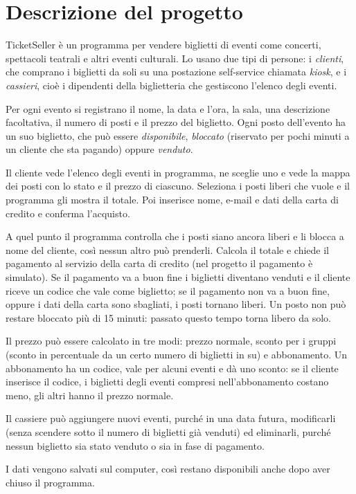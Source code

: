 \section{Descrizione del progetto}
\label{sec:descrizione}

TicketSeller è un programma per vendere biglietti di eventi come concerti, spettacoli teatrali e altri eventi culturali. Lo usano due tipi di persone: i \emph{clienti}, che comprano i biglietti da soli su una postazione self-service chiamata \emph{kiosk}, e i \emph{cassieri}, cioè i dipendenti della biglietteria che gestiscono l'elenco degli eventi.

Per ogni evento si registrano il nome, la data e l'ora, la sala, una descrizione facoltativa, il numero di posti e il prezzo del biglietto. Ogni posto dell'evento ha un suo biglietto, che può essere \emph{disponibile}, \emph{bloccato} (riservato per pochi minuti a un cliente che sta pagando) oppure \emph{venduto}.

Il cliente vede l'elenco degli eventi in programma, ne sceglie uno e vede la mappa dei posti con lo stato e il prezzo di ciascuno. Seleziona i posti liberi che vuole e il programma gli mostra il totale. Poi inserisce nome, e-mail e dati della carta di credito e conferma l'acquisto.

A quel punto il programma controlla che i posti siano ancora liberi e li blocca a nome del cliente, così nessun altro può prenderli. Calcola il totale e chiede il pagamento al servizio della carta di credito (nel progetto il pagamento è simulato). Se il pagamento va a buon fine i biglietti diventano venduti e il cliente riceve un codice che vale come biglietto; se il pagamento non va a buon fine, oppure i dati della carta sono sbagliati, i posti tornano liberi. Un posto non può restare bloccato più di 15 minuti: passato questo tempo torna libero da solo.

Il prezzo può essere calcolato in tre modi: prezzo normale, sconto per i gruppi (sconto in percentuale da un certo numero di biglietti in su) e abbonamento. Un abbonamento ha un codice, vale per alcuni eventi e dà uno sconto: se il cliente inserisce il codice, i biglietti degli eventi compresi nell'abbonamento costano meno, gli altri hanno il prezzo normale.

Il cassiere può aggiungere nuovi eventi, purché in una data futura, modificarli (senza scendere sotto il numero di biglietti già venduti) ed eliminarli, purché nessun biglietto sia stato venduto o sia in fase di pagamento.

I dati vengono salvati sul computer, così restano disponibili anche dopo aver chiuso il programma.
